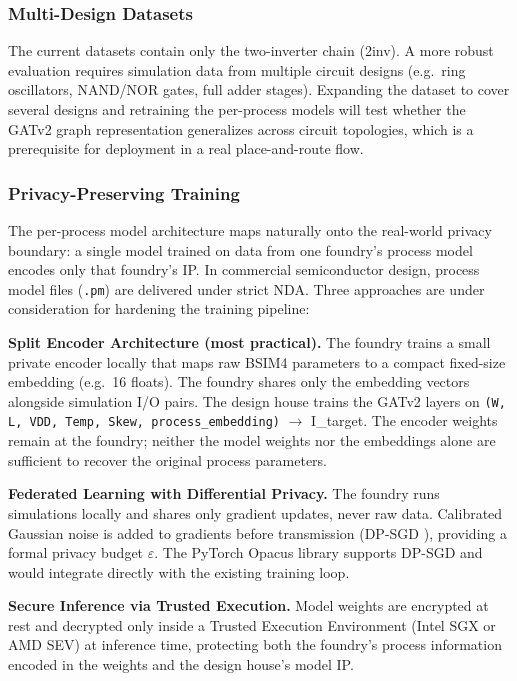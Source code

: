 \documentclass[10pt,twocolumn,letterpaper]{article}
\begin{document}
\subsubsection{Multi-Design Datasets}
\label{subsubsec:multi_design_datasets}

The current datasets contain only the two-inverter chain (2inv). A more robust evaluation requires simulation data from multiple circuit designs (e.g.\ ring oscillators, NAND/NOR gates, full adder stages). Expanding the dataset to cover several designs and retraining the per-process models will test whether the GATv2 graph representation generalizes across circuit topologies, which is a prerequisite for deployment in a real place-and-route flow.

\subsubsection{Privacy-Preserving Training}
\label{subsubsec:privacy_preserving}

The per-process model architecture maps naturally onto the real-world privacy boundary: a single model trained on data from one foundry's process model encodes only that foundry's IP. In commercial semiconductor design, process model files (\texttt{.pm}) are delivered under strict NDA. Three approaches are under consideration for hardening the training pipeline:

\textbf{Split Encoder Architecture (most practical).}
The foundry trains a small private encoder locally that maps raw BSIM4 parameters to a compact fixed-size embedding (e.g.\ 16 floats). The foundry shares only the embedding vectors alongside simulation I/O pairs. The design house trains the GATv2 layers on \texttt{(W, L, VDD, Temp, Skew, process\_embedding)} $\rightarrow$ I\_target. The encoder weights remain at the foundry; neither the model weights nor the embeddings alone are sufficient to recover the original process parameters.

\textbf{Federated Learning with Differential Privacy.}
The foundry runs simulations locally and shares only gradient updates, never raw data. Calibrated Gaussian noise is added to gradients before transmission (DP-SGD \cite{abadi2016deep}), providing a formal privacy budget $\varepsilon$. The PyTorch Opacus library supports DP-SGD and would integrate directly with the existing training loop.

\textbf{Secure Inference via Trusted Execution.}
Model weights are encrypted at rest and decrypted only inside a Trusted Execution Environment (Intel SGX or AMD SEV) at inference time, protecting both the foundry's process information encoded in the weights and the design house's model IP.
\end{document}
